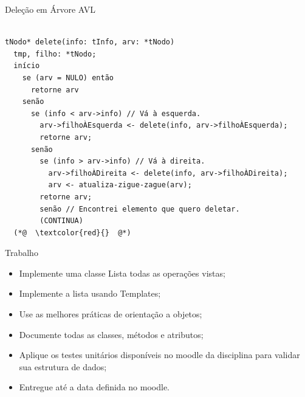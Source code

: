 \documentclass[12pt,table,xcolor={dvipsnames}]{beamer}
\begin{document}
\begin{frame}[fragile]{Deleção em Árvore AVL}
\begin{lstlisting}

tNodo* delete(info: tInfo, arv: *tNodo)
  tmp, filho: *tNodo;
  início
    se (arv = NULO) então
      retorne arv
    senão
      se (info < arv->info) // Vá à esquerda.
        arv->filhoÀEsquerda <- delete(info, arv->filhoÀEsquerda);
        retorne arv;
      senão
        se (info > arv->info) // Vá à direita.
          arv->filhoÀDireita <- delete(info, arv->filhoÀDireita);
          arv <- atualiza-zigue-zague(arv);
        retorne arv;
        senão // Encontrei elemento que quero deletar.
        (CONTINUA)   
  (*@  \textcolor{red}{}  @*)
\end{lstlisting}
\end{frame}










\begin{frame}[fragile]{Trabalho }
\begin{itemize}
\item Implemente uma classe Lista todas as operações vistas;
\item Implemente a lista usando Templates;
\item Use as melhores práticas de orientação a objetos;
\item Documente todas as classes, métodos e atributos;
\item Aplique os testes unitários disponíveis no moodle da disciplina para validar sua estrutura de dados;
\item Entregue até a data definida no moodle.
\end{itemize}
\end{frame}
\end{document}
